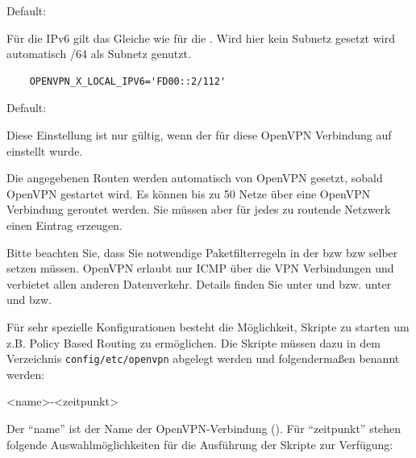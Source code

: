 \begin{description}
  Default: 
  
  Für die IPv6 gilt das Gleiche wie für die .
  Wird hier kein Subnetz gesetzt wird automatisch /64 als Subnetz genutzt.
  
  \begin{example}
  \begin{verbatim}
    OPENVPN_X_LOCAL_IPV6='FD00::2/112'
  \end{verbatim}
  \end{example}


  Default: 

  Diese Einstellung ist nur gültig, wenn der
   für diese OpenVPN Verbindung
  auf  einstellt wurde.

  Die angegebenen Routen werden automatisch von OpenVPN gesetzt,
  sobald OpenVPN gestartet wird. Es können bis zu 50 Netze über eine
  OpenVPN Verbindung geroutet werden. Sie müssen aber für jedes zu
  routende Netzwerk einen  Eintrag erzeugen.

  Bitte beachten Sie, dass Sie notwendige Paketfilterregeln in der
    bzw
    bzw
  selber setzen müssen. OpenVPN erlaubt nur ICMP über die VPN
  Verbindungen und verbietet allen anderen Datenverkehr. Details
  finden Sie unter
   und
   bzw.
  unter
   und
   bzw.
  
  Für sehr spezielle Konfigurationen besteht die Möglichkeit, Skripte
  zu starten um z.B. Policy Based Routing zu ermöglichen. Die Skripte
  müssen dazu in dem Verzeichnis \texttt{config/etc/openvpn} abgelegt
  werden und folgendermaßen benannt werden:

\begin{example}
  <name>-<zeitpunkt>
\end{example}

  Der ``name'' ist der Name der OpenVPN-Verbindung
  ().  Für ``zeitpunkt'' stehen folgende
  Auswahlmöglichkeiten für die Ausführung der Skripte zur Verfügung:


\end{description}
